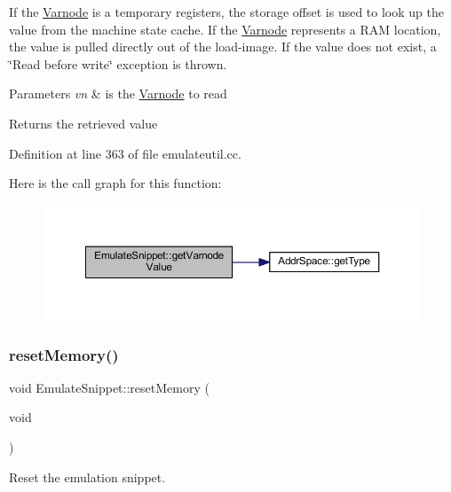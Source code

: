 If the \mbox{\hyperlink{class_varnode}{Varnode}} is a temporary registers, the storage offset is used to look up the value from the machine state cache. If the \mbox{\hyperlink{class_varnode}{Varnode}} represents a R\+AM location, the value is pulled directly out of the load-\/image. If the value does not exist, a \char`\"{}\+Read before write\char`\"{} exception is thrown. 
\begin{DoxyParams}{Parameters}
{\em vn} & is the \mbox{\hyperlink{class_varnode}{Varnode}} to read \\
\hline
\end{DoxyParams}
\begin{DoxyReturn}{Returns}
the retrieved value 
\end{DoxyReturn}


Definition at line 363 of file emulateutil.\+cc.

Here is the call graph for this function\+:
\nopagebreak
\begin{figure}[H]
\begin{center}
\leavevmode
\includegraphics[width=350pt]{class_emulate_snippet_af19946de88e6ea7dbf396648640fdb97_cgraph}
\end{center}
\end{figure}
\mbox{\label{class_emulate_snippet_a243812d9450f7d70610e23924def533f}} 
\subsubsection{\texorpdfstring{resetMemory()}{resetMemory()}}
{\footnotesize\ttfamily void Emulate\+Snippet\+::reset\+Memory (\begin{DoxyParamCaption}\item[{void}]{ }\end{DoxyParamCaption})\hspace{0.3cm}{\ttfamily [inline]}}



Reset the emulation snippet. 

